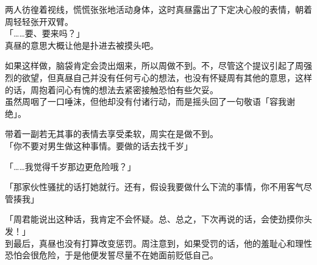 两人彷徨着视线，慌慌张张地活动身体，这时真昼露出了下定决心般的表情，朝着周轻轻张开双臂。\\

「……要、要来吗？」\\

真昼的意思大概让他是扑进去被摸头吧。

如果这样做，脑袋肯定会烫出烟来，所以周做不到。不，尽管这个提议引起了周强烈的欲望，但真昼自己并没有任何亏心的想法，也没有怀疑周有其他的意思，这样的话，周抱着问心有愧的想法去紧密接触恐怕有些欠妥。\\

虽然周咽了一口唾沫，但他却没有付诸行动，而是摇头回了一句敬语「容我谢绝」。

带着一副若无其事的表情去享受柔软，周实在是做不到。\\

「你不要对男生做这种事情。要做的话去找千岁」

「……我觉得千岁那边更危险哦？」

「那家伙性骚扰的话打她就行。还有，假设我要做什么下流的事情，你不用客气尽管揍我」

「周君能说出这种话，我肯定不会怀疑。总、总之，下次再说的话，会使劲摸你头发！」\\

到最后，真昼也没有打算改变惩罚。周注意到，如果受罚的话，他的羞耻心和理性恐怕会很危险，于是他便发誓尽量不在她面前贬低自己。
